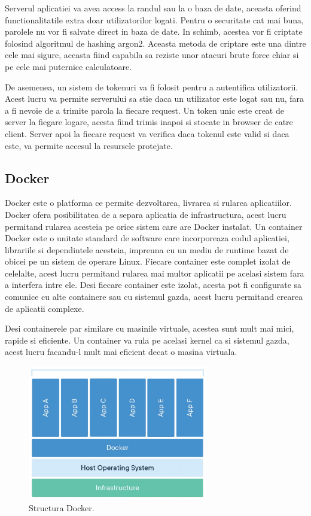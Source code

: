 \documentclass[titlepage,12pt]{article}
\begin{document}
Serverul aplicatiei va avea access la randul sau la o baza de date, aceasta oferind functionalitatile extra doar utilizatorilor logati.
Pentru o securitate cat mai buna, parolele nu vor fi salvate direct in baza de date.
In schimb, acestea vor fi criptate folosind algoritmul de hashing argon2.
Aceasta metoda de criptare este una dintre cele mai sigure, aceasta fiind capabila sa reziste unor atacuri brute force chiar si pe cele mai puternice calculatoare.

De asemenea, un sistem de tokenuri va fi folosit pentru a autentifica utilizatorii.
Acest lucru va permite serverului sa stie daca un utilizator este logat sau nu, fara a fi nevoie de a trimite parola la fiecare request.
Un token unic este creat de server la fiegare logare, acesta fiind trimis inapoi si stocate in browser de catre client.
Server apoi la fiecare request va verifica daca tokenul este valid si daca este, va permite accesul la resursele protejate.

\subsection {Docker}

Docker\cite{ref:docker} este o platforma ce permite dezvoltarea, livrarea si rularea aplicatiilor.
Docker ofera posibilitatea de a separa aplicatia de infrastructura, acest lucru permitand rularea acesteia pe orice sistem care are Docker instalat.
Un container Docker este o unitate standard de software care incorporeaza codul aplicatiei, librariile si dependintele acesteia, impreuna cu un mediu de runtime bazat de obicei pe un sistem de operare Linux.
Fiecare container este complet izolat de celelalte, acest lucru permitand rularea mai multor aplicatii pe acelasi sistem fara a interfera intre ele.
Desi fiecare container este izolat, acesta pot fi configurate sa comunice cu alte containere sau cu sistemul gazda, acest lucru permitand crearea de aplicatii complexe.

Desi containerele par similare cu masinile virtuale, acestea sunt mult mai mici, rapide si eficiente.
Un container va rula pe acelasi kernel ca si sistemul gazda, acest lucru facandu-l mult mai eficient decat o masina virtuala.

\begin{figure}[H]
    \centering
    \includegraphics[width=0.7\textwidth]{images/dockerstructure}
    \caption{Structura Docker.}
    \label{fig:containerstructure}
\end{figure}
\end{document}
